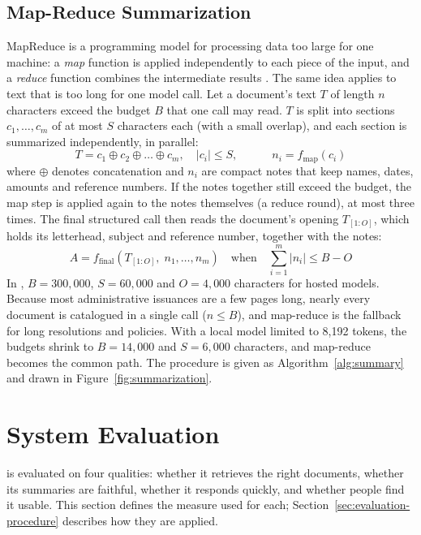 \subsection{Map-Reduce Summarization}\label{sec:mapreduce-theory}

MapReduce is a programming model for processing data too large for one machine: a \emph{map} function is applied independently to each piece of the input, and a \emph{reduce} function combines the intermediate results \citep{dean2004mapreduce}. The same idea applies to text that is too long for one model call. Let a document's text $T$ of length $n$ characters exceed the budget $B$ that one call may read. $T$ is split into sections $c_1, \dots, c_m$ of at most $S$ characters each (with a small overlap), and each section is summarized independently, in parallel:
\begin{equation}
  T = c_1 \oplus c_2 \oplus \dots \oplus c_m, \quad \lvert c_i \rvert \le S, \qquad\quad n_i = f_{\text{map}}(c_i) \label{eq:map}
\end{equation}
where $\oplus$ denotes concatenation and $n_i$ are compact notes that keep names, dates, amounts and reference numbers. If the notes together still exceed the budget, the map step is applied again to the notes themselves (a reduce round), at most three times. The final structured call then reads the document's opening $T_{[1:O]}$, which holds its letterhead, subject and reference number, together with the notes:
\begin{equation}
  A = f_{\text{final}}\left(T_{[1:O]},\; n_1, \dots, n_m\right) \quad \text{when} \quad \sum_{i=1}^{m} \lvert n_i \rvert \le B - O \label{eq:reduce}
\end{equation}
In \cs{}, $B = 300{,}000$, $S = 60{,}000$ and $O = 4{,}000$ characters for hosted models. Because most administrative issuances are a few pages long, nearly every document is catalogued in a single call ($n \le B$), and map-reduce is the fallback for long resolutions and policies. With a local model limited to 8,192 tokens, the budgets shrink to $B = 14{,}000$ and $S = 6{,}000$ characters, and map-reduce becomes the common path. The procedure is given as Algorithm~\ref{alg:summary} and drawn in Figure~\ref{fig:summarization}.

\section{System Evaluation}\label{sec:evaluation-theory}

\cs{} is evaluated on four qualities: whether it retrieves the right documents, whether its summaries are faithful, whether it responds quickly, and whether people find it usable. This section defines the measure used for each; Section~\ref{sec:evaluation-procedure} describes how they are applied.

